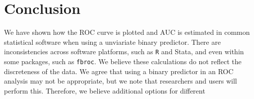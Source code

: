 \documentclass[article]{jss}
\begin{document}
\hypertarget{conclusion}{%
\section{Conclusion}\label{conclusion}}

We have shown how the ROC curve is plotted and AUC is estimated in
common statistical software when using a unviariate binary predictor.
There are inconsistencies across software platforms, such as \texttt{R}
and Stata, and even within some packages, such as \texttt{fbroc}. We
believe these calculations do not reflect the discreteness of the data.
We agree that using a binary predictor in an ROC analysis may not be
appropriate, but we note that researchers and users will perform this.
Therefore, we believe additional options for different


\end{document}
